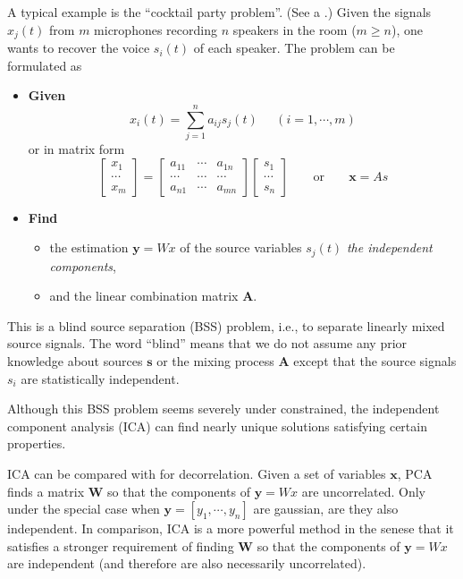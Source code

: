 \documentclass[12pt, a4paper, onecolumn]{IEEEtran}
\begin{document}
A typical example is the ``cocktail party problem''. (See a
.) Given
the signals $x_j(t)$ from $m$ microphones recording $n$ speakers in the
room ($m\ge n$), one wants to recover the voice $s_i(t)$ of each speaker.
The problem can be formulated as
\begin{itemize}
\item {\bf Given}
\[	x_i(t)=\sum_{j=1}^n a_{ij} s_j(t)\;\;\;\;\;(i=1,\cdots,m) \]
or in matrix form
\[	\left[ \begin{array}{c} x_1 \\ \cdots \\ x_m \end{array} \right]=
	\left[ \begin{array}{ccc} a_{11} & \cdots & a_{1n} \\
	\cdots & \cdots & \cdots \\ a_{n1} & \cdots & a_{mn}
\end{array} \right]
\left[ \begin{array}{c} s_1 \\ \cdots \\ s_n \end{array} \right]
\;\;\;\;\;\;\;\mbox{or}\;\;\;\;\;\;\;	{\mathbf x=As}	\]
\item {\bf Find}
\begin{itemize}
\item the estimation ${\mathbf y=Wx}$ of the source variables $s_j(t)$
	{\em the independent components},
\item and the linear combination matrix ${\mathbf A}$.
\end{itemize}
\end{itemize}
This is a blind source separation (BSS) problem, i.e., to separate
linearly mixed source signals. The word ``blind'' means that we do
not assume any prior knowledge about sources ${\mathbf s}$ or the mixing
process ${\mathbf A}$ except that the source signals $s_i$ are statistically
independent.

Although this BSS problem seems severely under constrained, the independent
component analysis (ICA) can find nearly unique solutions satisfying
certain properties.

ICA can be compared with
for decorrelation.  Given a set of variables ${\mathbf x}$, PCA finds a
matrix ${\mathbf W}$ so that the components of ${\mathbf y=Wx}$ are
uncorrelated. Only under the special case when ${\mathbf y}=[y_1,\cdots,y_n]$
are gaussian, are they also independent. In comparison, ICA is a more powerful
method in the senese that it satisfies a stronger requirement of finding
${\mathbf W}$ so that the components of ${\mathbf y=Wx}$ are independent
(and therefore are also necessarily uncorrelated).
\end{document}
